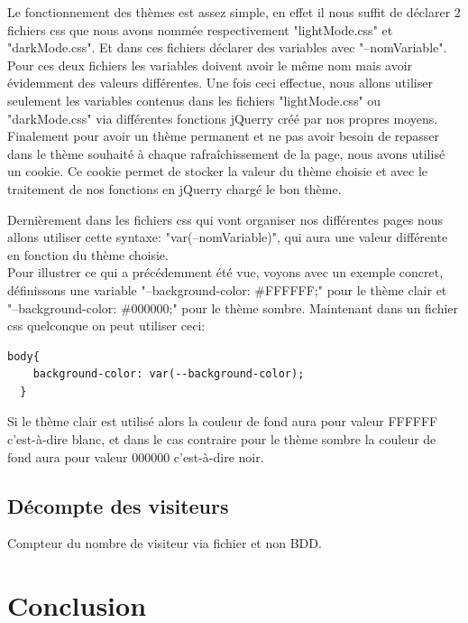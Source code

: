 \documentclass[a4paper,10pt]{article}
\begin{document}
Le fonctionnement des thèmes est assez simple, en effet il nous suffit de déclarer 2 fichiers css que nous avons nommée respectivement "lightMode.css" et "darkMode.css". Et dans ces fichiers déclarer des variables avec "--nomVariable". Pour ces deux fichiers les variables doivent avoir le même nom mais avoir évidemment des valeurs différentes. Une fois ceci effectue, nous allons utiliser seulement les variables contenus dans les fichiers "lightMode.css" ou "darkMode.css" via différentes fonctions jQuerry créé par nos propres moyens. Finalement pour avoir un thème permanent et ne pas avoir besoin de repasser dans le thème souhaité à chaque rafraîchissement de la page, nous avons utilisé un cookie. Ce cookie permet de stocker la valeur du thème choisie et avec le traitement de nos fonctions en jQuerry chargé le bon thème.

Dernièrement dans les fichiers css qui vont organiser nos différentes pages nous allons utiliser cette syntaxe: "var(--nomVariable)", qui aura une valeur différente en fonction du thème choisie.\\

Pour illustrer ce qui a précédemment été vue, voyons avec un exemple concret, définissons une variable "--background-color: \#FFFFFF;" pour le thème clair et "--background-color: \#000000;" pour le thème sombre. Maintenant dans un fichier css quelconque on peut utiliser ceci:
\begin{lstlisting}[language=HTML]
  body{
    background-color: var(--background-color);
  }
\end{lstlisting}
Si le thème clair est utilisé alors la couleur de fond aura pour valeur FFFFFF c'est-à-dire blanc, et dans le cas contraire pour le thème sombre la couleur de fond aura pour valeur 000000 c'est-à-dire noir.

\subsection{Décompte des visiteurs}
Compteur du nombre de visiteur via fichier et non BDD.

\section{Conclusion}
\end{document}

